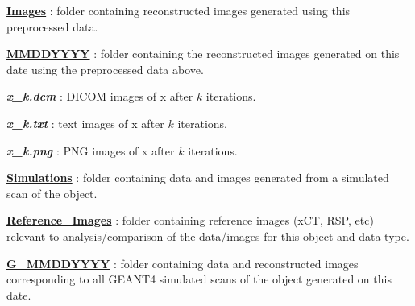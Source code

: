 \documentclass{article}
\begin{document}
\begin{myEnumerate}[labelindent=0pt, leftmargin=*]
\begin{myEnumerate}[labelindent=1pt, leftmargin=*]
\begin{myEnumerate}[labelindent=1pt, leftmargin=*]
\begin{myEnumerate}[labelindent=1pt, leftmargin=*]
\begin{myEnumerate}[labelindent=1pt, leftmargin=*]
\begin{myEnumerate}[labelindent=1pt, leftmargin=*]
\begin{myEnumerate}[labelindent=1pt, leftmargin=*]
\begin{myEnumerate}[labelindent=1pt, leftmargin=*]
\begin{myEnumerate}[labelindent=1pt, leftmargin=*]
                                    \item \ul{\textbf{Images}} : folder containing reconstructed images generated using this preprocessed data.
                                    \begin{myEnumerate}[labelindent=1pt, leftmargin=*]
                                        \item \ul{\textbf{MMDDYYYY}} : folder containing the reconstructed images generated on this date using the preprocessed data above.
                                            \begin{myEnumerate}[labelindent=1pt, leftmargin=*]
                                                \item \textbf{\textit{x\_k.dcm}} : DICOM images of x after $k$ iterations.
                                                \item \textbf{\textit{x\_k.txt}} : text images of x after $k$ iterations.
                                                \item \textbf{\textit{x\_k.png}} : PNG images of x after $k$ iterations.
                                            \end{myEnumerate}
                                    \end{myEnumerate}
                                \end{myEnumerate}
                            \end{myEnumerate}
                        \end{myEnumerate}
                    \end{myEnumerate}
                \end{myEnumerate}
            \end{myEnumerate}
        \end{myEnumerate}
        \item \ul{\textbf{Simulations}} : folder containing data and images generated from a simulated scan of the object.
        \begin{myEnumerate}[labelindent=1pt, leftmargin=*]
            \item \ul{\textbf{Reference\_Images}} : folder containing reference images (xCT, RSP, etc) relevant to analysis/comparison of the data/images for this object and data type.
            \item \ul{\textbf{G\_MMDDYYYY}} : folder containing data and reconstructed images corresponding to all GEANT4 simulated scans of the object generated on this date.

\end{myEnumerate}
\end{myEnumerate}
\end{myEnumerate}
\end{document}
